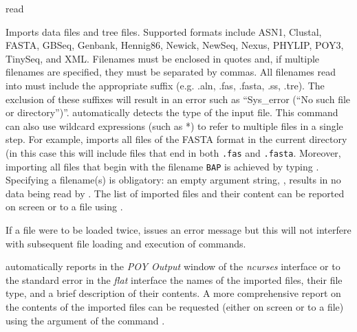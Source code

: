 \begin{command}{read}{}


	\begin{poydescription} 
        Imports data files and tree files.  Supported formats include ASN1, Clustal, FASTA,
        GBSeq, Genbank, Hennig86, Newick, NewSeq, Nexus, PHYLIP, POY3,
        TinySeq, and XML. Filenames must be enclosed in quotes and, if multiple
        filenames are specified, they must be separated by commas. All filenames 
        read into \poy must include the appropriate suffix (e.g. .aln, .fas, 
        .fasta, .ss, .tre). The exclusion of these suffixes will result in an error such as 
        ``Sys\_error (``No such file or directory'')''.   automatically detects the type of the 
        input file. This command can also use wildcard expressions (such as *) to
        refer to multiple files in a single step. For example,  
        imports all files of the FASTA format in the current directory (in this case 
        this will include files that end in both \texttt{.fas} and \texttt{.fasta}. Moreover, 
        importing all files that begin with the filename \texttt{BAP} is achieved by typing 
        . Specifying a filename(s) is obligatory: 
        an empty argument string, , results in no data being 
        read by \poy. The list of imported files and their content
        can be reported on screen or to a file using .
        
        If a file were to be loaded twice, \poy issues an error message but this will not
        interfere with subsequent file loading and execution of commands.
        
       \poy automatically reports in the \emph{POY Output} window of the \emph{ncurses}
            interface or to the standard error in the \emph{flat} interface the names
            of the imported files, their file type, and a brief description of
            their contents. A more comprehensive report on the contents of the imported
            files can be requested (either on screen or to a file) using the argument
             of the command .
            
    	\end{poydescription}

	\begin{arguments}


\end{arguments}
\end{command}
